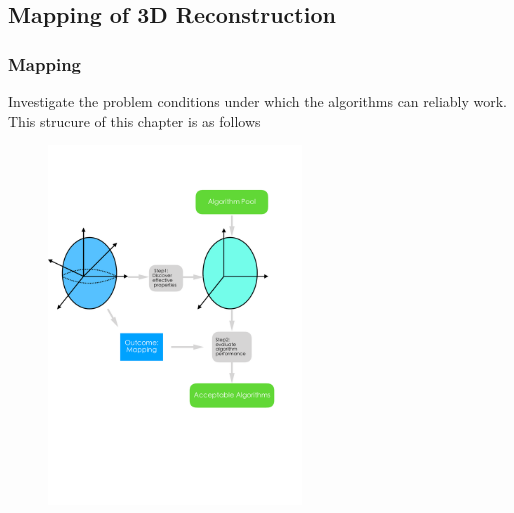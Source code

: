 \documentclass{beamer}
\begin{document}
\subsection{Mapping of 3D Reconstruction}
\begin{frame}
\frametitle{Mapping}

Investigate the problem conditions under which the algorithms can reliably work. This strucure of this chapter is as follows

\begin{figure}
\centering
\includegraphics[width=0.6\textwidth]{images/mapping_3d_vision.pdf}
\end{figure}


\end{frame}
\end{document}
